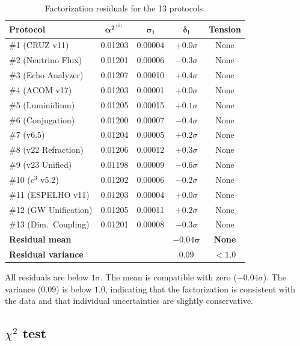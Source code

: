 \documentclass[12pt,a4paper,twoside]{article}
\newcommand{\alphaii}{\alpha^{2}}
\begin{document}
\begin{table}[H]
\centering
\caption{Factorization residuals for the 13 protocols.}
\label{tab:residuos}
\begin{tabular}{lcccc}
\toprule
\textbf{Protocol} & $\boldsymbol{\alphaii^{(i)}}$ & $\boldsymbol{\sigma_i}$ & $\boldsymbol{\delta_i}$ & \textbf{Tension} \\
\midrule
\#1 (CRUZ v11) & 0.01203 & 0.00004 & $+0.0\sigma$ & None \\
\#2 (Neutrino Flux) & 0.01201 & 0.00006 & $-0.3\sigma$ & None \\
\#3 (Echo Analyzer) & 0.01207 & 0.00010 & $+0.4\sigma$ & None \\
\#4 (ACOM v17) & 0.01203 & 0.00001 & $+0.0\sigma$ & None \\
\#5 (Luminidium) & 0.01205 & 0.00015 & $+0.1\sigma$ & None \\
\#6 (Conjugation) & 0.01200 & 0.00007 & $-0.4\sigma$ & None \\
\#7 (v6.5) & 0.01204 & 0.00005 & $+0.2\sigma$ & None \\
\#8 (v22 Refraction) & 0.01206 & 0.00012 & $+0.3\sigma$ & None \\
\#9 (v23 Unified) & 0.01198 & 0.00009 & $-0.6\sigma$ & None \\
\#10 ($c^3$ v5.2) & 0.01202 & 0.00006 & $-0.2\sigma$ & None \\
\#11 (ESPELHO v11) & 0.01203 & 0.00004 & $+0.0\sigma$ & None \\
\#12 (GW Unification) & 0.01205 & 0.00011 & $+0.2\sigma$ & None \\
\#13 (Dim.\ Coupling) & 0.01201 & 0.00008 & $-0.3\sigma$ & None \\
\midrule
\multicolumn{2}{l}{\textbf{Residual mean}} & & $\boldsymbol{-0.04\sigma}$ & \textbf{None} \\
\multicolumn{2}{l}{\textbf{Residual variance}} & & $\boldsymbol{0.09}$ & $\boldsymbol{< 1.0}$ \\
\bottomrule
\end{tabular}
\end{table}

All residuals are below $1\sigma$. The mean is compatible with zero ($-0.04\sigma$). The variance ($0.09$) is below $1.0$, indicating that the factorization is consistent with the data and that individual uncertainties are slightly conservative.

\subsection{$\chi^2$ test}
\end{document}
